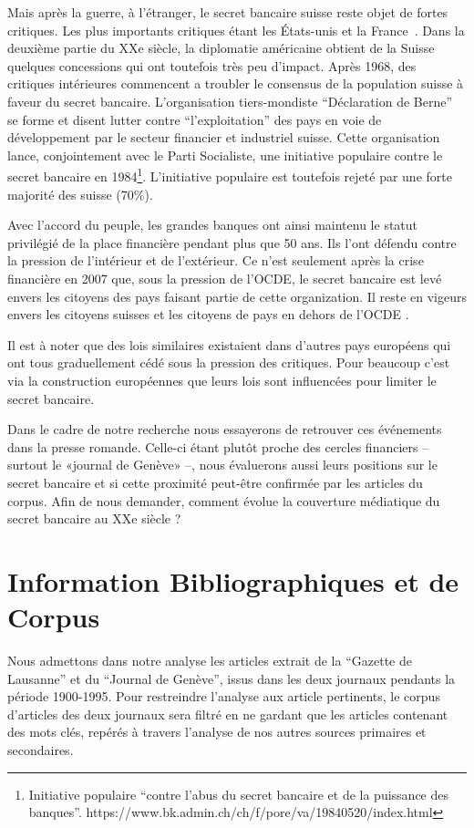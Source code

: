 \documentclass[11pt]{article}
\begin{document}
Mais après la guerre, à l'étranger, le secret bancaire suisse reste objet de
fortes critiques. Les plus importants critiques étant les États-unis et la
France~\citep[p.503]{Mazbouri12}. Dans la deuxième partie du XXe siècle, la
diplomatie américaine obtient de la Suisse quelques concessions qui ont
toutefois très peu d'impact. Après 1968, des critiques intérieures commencent a
troubler le consensus de la population suisse à faveur du secret bancaire.
L’organisation tiers-mondiste “Déclaration de Berne” \citep{EvB} se forme et
disent lutter contre ``l'exploitation'' des pays en voie de développement par le
secteur financier et industriel suisse. Cette organisation lance, conjointement
avec le Parti Socialiste, une initiative populaire contre le secret bancaire en
1984\footnote{Initiative populaire ``contre l'abus du secret bancaire et de la
puissance des banques''.
https://www.bk.admin.ch/ch/f/pore/va/19840520/index.html}. L'initiative
populaire est toutefois rejeté par une forte majorité des suisse (70\%).

Avec l'accord du peuple, les grandes banques ont ainsi maintenu le
statut privilégié de la place financière pendant plus que 50 ans. Ils l’ont
défendu contre la pression de l’intérieur et de l’extérieur. Ce n’est
seulement après la crise financière en 2007 que, sous la pression de l'OCDE,
le secret bancaire est levé envers les citoyens des pays faisant partie de
cette organization. Il reste
en vigeurs envers les citoyens suisses et les citoyens de pays en dehors de
l'OCDE \citep{NeufVies}.

Il est à noter que des lois similaires existaient dans d'autres pays européens
qui ont tous graduellement cédé sous la pression des critiques. Pour beaucoup
c'est via la construction européennes que leurs lois sont influencées pour 
limiter le secret bancaire\citep[p. 32]{Palan09}. 

Dans le cadre de notre recherche nous essayerons de retrouver ces événements
dans la presse romande. Celle-ci étant plutôt proche des cercles financiers –
surtout le «journal de Genève» \citep{ConfClass1} –, nous évaluerons aussi
leurs positions sur le secret bancaire et si cette proximité peut-être
confirmée par les articles du corpus. Afin de nous demander, comment évolue la
couverture médiatique du secret bancaire au XXe siècle ? 

\section{Information Bibliographiques et de Corpus}
Nous admettons dans notre analyse les articles extrait de la “Gazette de
Lausanne” et du “Journal de Genève”, issus dans les deux journaux pendants la
période 1900-1995. Pour restreindre l’analyse aux article pertinents, le corpus
d’articles des deux journaux sera filtré en ne gardant que les articles
contenant des mots clés, repérés à travers l’analyse de nos autres sources
primaires et secondaires.
\end{document}

